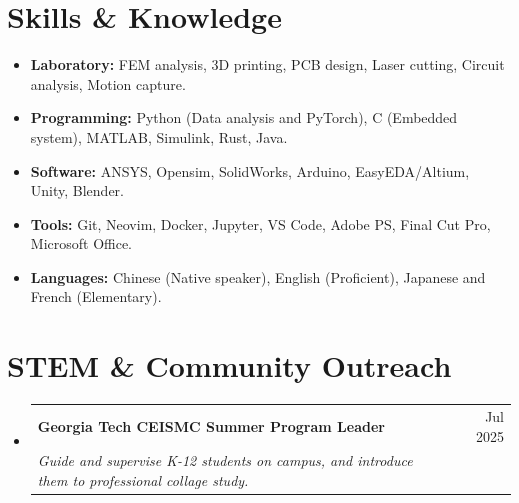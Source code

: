 \documentclass[letterpaper,11pt]{article}
\makeatletter
\newcommand{\resumeItem}[1]{
  \item\small{
    {#1 \vspace{-2pt}}
  }
}
\newcommand{\resumeSubheading}[4]{
  \vspace{-2pt}\item
    \begin{tabular*}{0.97\textwidth}[t]{l@{\extracolsep{\fill}}r}
      \textbf{#1} & #2 \\
      \textit{\small#3} & \textit{\small #4} \\
    \end{tabular*}\vspace{-7pt}
}
\newcommand{\resumeSubHeadingListStart}{\begin{itemize}[leftmargin=0.15in, label={}]}
\newcommand{\resumeSubHeadingListEnd}{\end{itemize}}
\newcommand{\resumeItemListStart}{\begin{itemize}}
\newcommand{\resumeItemListEnd}{\end{itemize}\vspace{-5pt}}
\makeatother
\begin{document}
\vspace{-15pt}
\section{Skills \& Knowledge}
\vspace{1pt}
\resumeItemListStart

\resumeItem{\textbf{Laboratory:}
  FEM analysis, 3D printing, PCB design, Laser cutting, Circuit analysis, Motion capture.
}
\vspace{-5pt}
\resumeItem{\textbf{Programming:}
  Python (Data analysis and PyTorch), C (Embedded system), MATLAB, Simulink, Rust, Java.
}
\vspace{-5pt}
\resumeItem{\textbf{Software:}
  ANSYS, Opensim, SolidWorks, Arduino, EasyEDA/Altium, Unity, Blender.
}
\vspace{-5pt}
\resumeItem{\textbf{Tools:}
  Git, Neovim, Docker, Jupyter, VS Code, Adobe PS, Final Cut Pro, Microsoft Office.
}
\vspace{-5pt}
\resumeItem{\textbf{Languages:}
  Chinese (Native speaker), English (Proficient), Japanese and French (Elementary).
}

\resumeItemListEnd
\vspace{-5pt}
\vspace{-5pt}

\section{STEM \& Community Outreach}
\resumeSubHeadingListStart
\resumeSubheading
  {Georgia Tech CEISMC Summer Program Leader}
  {Jul 2025}
  {Guide and supervise K-12 students on campus, and introduce them to professional collage study.}
  {}
\vspace{-18pt}
\resumeSubHeadingListEnd

\end{document}
